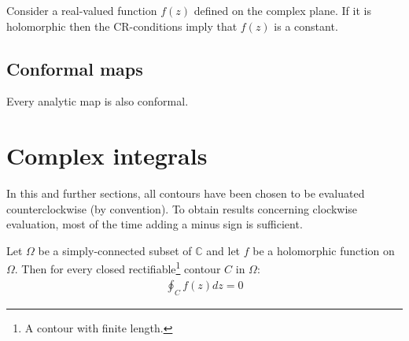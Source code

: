 	\begin{property}
		Consider a real-valued function $f(z)$ defined on the complex plane. If it is holomorphic then the CR-conditions imply that $f(z)$ is a constant.
	\end{property}

\subsection{Conformal maps}

	\begin{property}
		Every analytic map is also conformal.	
	\end{property}

\section{Complex integrals}
		
	In this and further sections, all contours have been chosen to be evaluated counterclockwise (by convention). To obtain results concerning clockwise evaluation, most of the time adding a minus sign is sufficient.
        
        
        \begin{theorem}
        	Let $\Omega$ be a simply-connected subset of $\mathbb{C}$ and let $f$ be a holomorphic function on $\Omega$. Then for every closed rectifiable\footnote{A contour with finite length.} contour $C$  in $\Omega$:
        	\begin{gather}
			\label{complexcalculus:cauchy_integral_theorem}
        	        \boxed{\oint_C f(z) dz = 0}
		\end{gather}
        \end{theorem}
        
